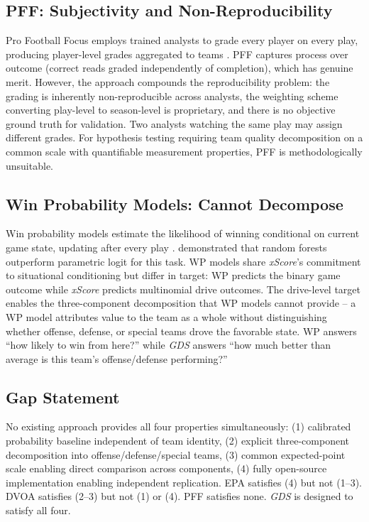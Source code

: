 \documentclass[12pt,a4paper]{article}
\newcommand{\xscore}{\textit{xScore}}
\newcommand{\gds}{\textit{GDS}}
\begin{document}
\subsection{PFF: Subjectivity and Non-Reproducibility}

Pro Football Focus employs trained analysts to grade every player on every play, producing player-level grades aggregated to teams \citep{pff2014grades}. PFF captures process over outcome (correct reads graded independently of completion), which has genuine merit. However, the approach compounds the reproducibility problem: the grading is inherently non-reproducible across analysts, the weighting scheme converting play-level to season-level is proprietary, and there is no objective ground truth for validation. Two analysts watching the same play may assign different grades. For hypothesis testing requiring team quality decomposition on a common scale with quantifiable measurement properties, PFF is methodologically unsuitable.

\subsection{Win Probability Models: Cannot Decompose}

Win probability models estimate the likelihood of winning conditional on current game state, updating after every play \citep{stern1991probability, lock2014randomforests}. \citet{lock2014randomforests} demonstrated that random forests outperform parametric logit for this task. WP models share \xscore{}'s commitment to situational conditioning but differ in target: WP predicts the binary game outcome while \xscore{} predicts multinomial drive outcomes. The drive-level target enables the three-component decomposition that WP models cannot provide -- a WP model attributes value to the team as a whole without distinguishing whether offense, defense, or special teams drove the favorable state. WP answers ``how likely to win from here?'' while \gds{} answers ``how much better than average is this team's offense/defense performing?''

\subsection{Gap Statement}

No existing approach provides all four properties simultaneously: (1) calibrated probability baseline independent of team identity, (2) explicit three-component decomposition into offense/defense/special teams, (3) common expected-point scale enabling direct comparison across components, (4) fully open-source implementation enabling independent replication. EPA satisfies (4) but not (1--3). DVOA satisfies (2--3) but not (1) or (4). PFF satisfies none. \gds{} is designed to satisfy all four.
\end{document}

